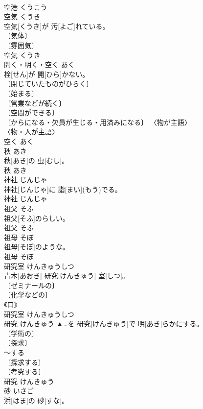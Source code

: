 \documentclass[8pt]{extreport}
\begin{document}
\begin{CJK}{UTF8}{min}
\\	空港	くうこう	
\\	空気	くうき	
\\	空気[くうき]が 汚[よご]れている。	
\\	〔気体〕 
\\	〔雰囲気〕 
\\	空気	くうき	
\\	開く・明く・空く	あく	
\\	栓[せん]が 開[ひら]かない。	
\\	〔閉じていたものがひらく〕 
\\	〔始まる〕 
\\	〔営業などが続く〕 
\\	〔空間ができる〕 
\\	〔からになる・欠員が生じる・用済みになる〕 〈物が主語〉 
\\	〈物・人が主語〉 
\\	空く	あく	
\\	秋	あき	
\\	秋[あき]の 虫[むし]。	
\\	秋	あき	
\\	神社	じんじゃ	
\\	神社[じんじゃ]に 詣[まい](もう)でる。	
\\	神社	じんじゃ	
\\	祖父	そふ	
\\	祖父[そふ]の{らしい}。	
\\	祖父	そふ	
\\	祖母	そぼ	
\\	祖母[そぼ]のような。	
\\	祖母	そぼ	
\\	研究室	けんきゅうしつ	
\\	青木[あおき] 研究[けんきゅう] 室[しつ]。	
\\	〔ゼミナールの〕 
\\	〔化学などの〕 
\\	《口》 
\\	研究室	けんきゅうしつ	
\\	研究	けんきゅう	▲…を 研究[けんきゅう]で 明[あき]らかにする。	
\\	〔学術の〕 
\\	〔探求〕 
\\	～する 
\\	〔探求する〕 
\\	〔考究する〕 
\\	研究	けんきゅう	
\\	砂	いさご	
\\	浜[はま]の 砂[すな]。	

\end{CJK}
\end{document}
